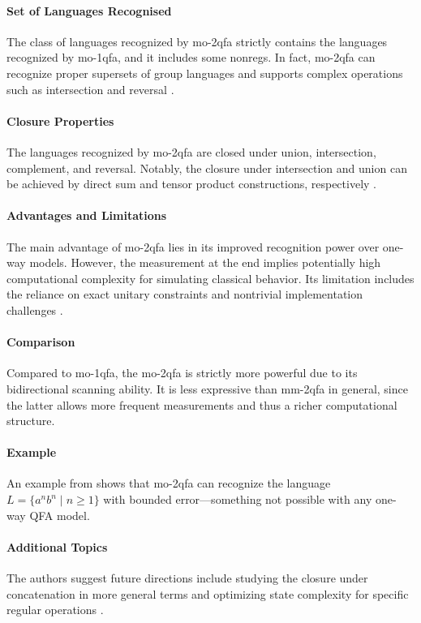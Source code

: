 \paragraph{Set of Languages Recognised} The class of languages recognized by \gls{mo-2qfa} strictly contains the languages recognized by \gls{mo-1qfa}, and it includes some non\glspl{reg}. In fact, \gls{mo-2qfa} can recognize proper supersets of group languages and supports complex operations such as intersection and reversal \cite{xi2008some}.

\paragraph{Closure Properties} The languages recognized by \gls{mo-2qfa} are closed under union, intersection, complement, and reversal. Notably, the closure under intersection and union can be achieved by direct sum and tensor product constructions, respectively \cite{xi2008some}.

\paragraph{Advantages and Limitations} The main advantage of \gls{mo-2qfa} lies in its improved recognition power over one-way models. However, the measurement at the end implies potentially high computational complexity for simulating classical behavior. Its limitation includes the reliance on exact unitary constraints and nontrivial implementation challenges \cite{xi2008some}.

\paragraph{Comparison} Compared to \gls{mo-1qfa}, the \gls{mo-2qfa} is strictly more powerful due to its bidirectional scanning ability. It is less expressive than \gls{mm-2qfa} in general, since the latter allows more frequent measurements and thus a richer computational structure.

\paragraph{Example} An example from \cite{xi2008some} shows that \gls{mo-2qfa} can recognize the language $L = \{ a^nb^n \mid n \geq 1 \}$ with bounded error—something not possible with any one-way QFA model.

\paragraph{Additional Topics} The authors suggest future directions include studying the closure under concatenation in more general terms and optimizing state complexity for specific regular operations \cite{xi2008some}.

